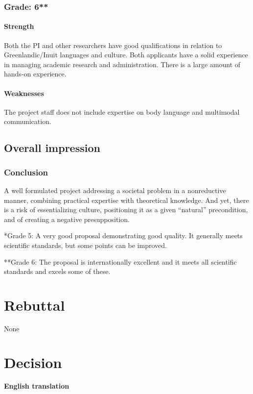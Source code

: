 \documentclass[twocolumn, issue, rga, authordate]{jote-new-article}
\begin{document}
\subsubsection{Grade: 6**}

\paragraph{Strength}
Both the PI and other researchers have good qualifications in relation to Greenlandic/Inuit languages and culture. Both applicants have a solid experience in managing academic research and administration. There is a large amount of hands-on experience.

\paragraph{Weaknesses}
The project staff does not include expertise on body language and multimodal communication.

\subsection{Overall impression}
\subsubsection{Conclusion}
A well formulated project addressing a societal problem in a nonreductive manner, combining practical expertise with theoretical knowledge. And yet, there is a risk of essentializing culture, positioning it as a given ``natural'' precondition, and of creating a negative presupposition.

*Grade 5: A very good proposal demonstrating good quality. It generally meets scientific standards, but some points can be improved.

**Grade 6: The proposal is internationally excellent and it meets all scientific standards and excels some of these.


\section{Rebuttal}


None


\section{Decision}

\paragraph{English translation}
\end{document}
